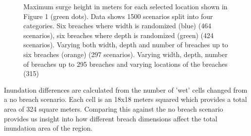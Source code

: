 \documentclass{coastal_paper}
\begin{document}
\begin{figure}[ht]
\caption{Maximum surge height in meters for each selected location shown in Figure 1 (green dots). Data shows 1500 scenarios split into four categories. Six breaches where width is randomized (blue) (464 scenarios), six breaches where depth is randomized (green) (424 scenarios). Varying both width, depth and number of breaches up to six breaches (orange) (297 scenarios). Varying width, depth, number of breaches up to 295 breaches and varying locations of the breaches (315)}
\label{fig2}
\end{figure}

Inundation differences are calculated from the number of 'wet' cells changed from a no breach scenario. Each cell is an 18x18 meters squared which provides a total area of 324 square meters. Comparing this against the no breach scenario provides us insight into how different breach dimensions affect the total inundation area of the region.
\end{document}
